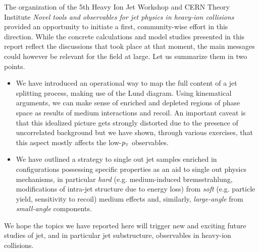 The organization of the 5th Heavy Ion Jet Workshop and CERN Theory Institute {\sl Novel tools and observables for jet physics in heavy-ion collisions} provided an opportunity to initiate a first, community-wise effort in this direction.
While the concrete calculations and model studies presented in this report reflect the discussions that took place at that moment, the main messages could however be relevant for the field at large. Let us summarize them in two points.
\begin{itemize}

\item We have introduced an operational way to map the full content of a jet splitting process, making use of the Lund diagram. Using kinematical arguments, we can make sense of enriched and depleted regions of phase space as results of medium interactions and recoil. An important caveat is that this idealized picture gets strongly distorted due to the presence of uncorrelated background but we have shown, through various exercises, that this aspect mostly affects the low-$p_{\text{\tiny T}}$ observables.

\item We have outlined a strategy to single out jet samples enriched in configurations possessing specific properties as an aid to single out physics mechanisms, in particular \textsl{hard} (e.g. medium-induced bremsstrahlung, modifications of intra-jet structure due to energy loss) from \textsl{soft} (e.g. particle yield, sensitivity to recoil) medium effects and, similarly, \textsl{large-angle} from \textsl{small-angle} components.

\end{itemize}
We hope the topics we have reported here will trigger new and exciting future studies of jet, and in particular jet substructure, observables in heavy-ion collisions.

